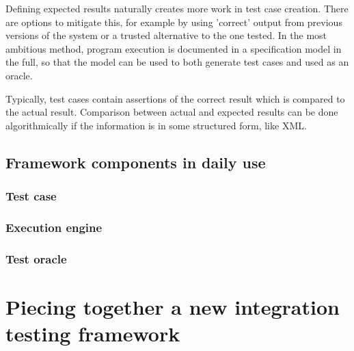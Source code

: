 \documentclass[12pt,a4paper,oneside,pdftex]{report}
\begin{document}
{Defining expected results naturally creates more work in test case creation. There are options to mitigate this, for example by using 'correct' output from previous versions of the system or a trusted alternative to the one tested. In the most ambitious method, program execution is documented in a specification model in the full, so that the model can be used to both generate test cases and used as an oracle. \citep{pezze2008software}

Typically, test cases contain assertions of the correct result which is compared to the actual result. Comparison between actual and expected results can be done algorithmically if the information is in some structured form, like XML.

\section{Framework components in daily use}


\subsection{Test case}


\subsection{Execution engine}


\subsection{Test oracle}

  
\chapter{Piecing together a new integration testing framework}
\label{chapter:frameworkproposal}

}
\end{document}
